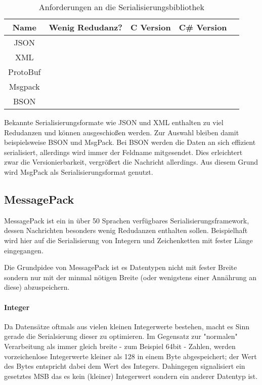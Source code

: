 \documentclass[
    12pt,
    bibliography=totoc,
    ngerman,
	enabledeprecatedfontcommands
]{scrartcl}
\newcommand{\xmark}{\text{\sffamily X}} %
\begin{document}
\begin{table}[h]
\centering
\begin{tabu}{c | c | c | c | p{5cm}}
	\toprule
	Name & Wenig Redudanz? & C Version & C\# Version \\
	\midrule
	JSON & \xmark & \checkmark & \checkmark \\
	XML & \xmark & \checkmark & \checkmark \\
	ProtoBuf & \checkmark & \xmark\footnotemark & \checkmark \\
	Msgpack\cite{msgpack} & \checkmark & \checkmark & \checkmark \\
	BSON & \checkmark & \checkmark & \checkmark \\
	\bottomrule
\end{tabu}
\caption{Anforderungen an die Serialisierungsbibliothek}
\end{table}

Bekannte Serialisierungsformate wie JSON und XML enthalten zu viel Redudanzen und k{\"{o}}nnen ausgeschio{\ss}en werden. Zur Auswahl bleiben damit beispielsweise BSON und MsgPack.
Bei BSON werden die Daten an sich effizient serialisiert, allerdings wird immer der Feldname mitgesendet. Dies erleichtert zwar die Versionierbarkeit, vergr{\"{o}}{\ss}ert
die Nachricht allerdings. Aus diesem Grund wird MsgPack als Serialisierungsformat genutzt.

\subsection{MessagePack}
MessagePack ist ein in {\"{u}}ber 50 Sprachen verf{\"{u}}gbares Serialisierungsframework, dessen Nachrichten besonders wenig Redudanzen enthalten sollen. Beispielhaft wird hier auf die Serialisierung von
Integern und Zeichenketten mit fester L{\"{a}}nge eingegangen.

Die Grundpidee von MessagePack ist es Datentypen nicht mit fester Breite sondern nur mit der minmal n{\"{o}}tigen Breite (oder wenigstens einer Ann{\"{a}}hrung an diese) abzuspeichern.
\paragraph{Integer} Da Datens{\"{a}}tze oftmals aus vielen kleinen Integerwerte bestehen, macht es Sinn gerade die Serialsierung dieser zu optimieren. Im Gegensatz zur "normalen" Verarbeitung als immer gleich breite - zum Beispiel 64bit - Zahlen, werden vorzeichenlose Integerwerte kleiner als 128 in einem Byte abgespeichert; der Wert des Bytes entspricht dabei dem Wert des Integers. Dahingegen signalisiert ein gesetztes MSB das es kein (kleiner) Integerwert sondern ein anderer Datentyp ist.
\end{document}

